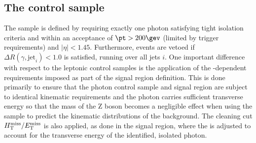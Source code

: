 %
%
%
%
%

\subsection{The \texorpdfstring{\gj}{photon plus jets} control sample}
\label{subsec:photoncontrolSelection}

The \gj sample is defined by requiring exactly one photon satisfying
tight isolation criteria and within an acceptance of $\pt > 200\gev$
(limited by trigger requirements) and $|\eta| < 1.45$. Furthermore,
events are vetoed if $\Delta R(\gamma,\textrm{jet}_i) < 1.0$ is
satisfied, running over all jets $i$. One important difference with
respect to the leptonic control samples is the application of the
\HT-dependent \alphat requirements imposed as part of the signal
region definition. This is done primarily to ensure that the photon
control sample and signal region are subject to identical kinematic
requirements and the photon carries sufficient transverse energy so
that the mass of the Z boson becomes a negligible effect when using
the \gj sample to predict the kinematic distributions of the \znunu
background. The cleaning cut $\mbox{$H_{\rm T}^{\rm miss}$}/\mbox{$E_\text{T}^{\rm miss}$}$ is also applied, as done in
the signal region, where the \met is adjusted to account for the
transverse energy of the identified, isolated photon. 
